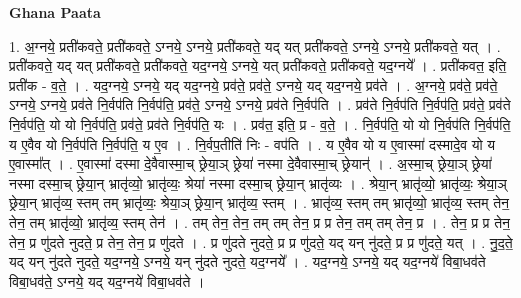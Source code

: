 \documentclass[17pt]{extarticle}
\begin{document}
\textbf{Ghana Paata } \newline

1. अ॒ग्नये॒ प्रती॑कवते॒ प्रती॑कवते॒ ऽग्नये॒ ऽग्नये॒ प्रती॑कवते॒ यद् यत् प्रती॑कवते॒ ऽग्नये॒ ऽग्नये॒ प्रती॑कवते॒ यत् । . प्रती॑कवते॒ यद् यत् प्रती॑कवते॒ प्रती॑कवते॒ यद॒ग्नये॒ ऽग्नये॒ यत् प्रती॑कवते॒ प्रती॑कवते॒ यद॒ग्नये᳚ । . प्रती॑कवत॒ इति॒ प्रती॑क - व॒ते॒ । . यद॒ग्नये॒ ऽग्नये॒ यद् यद॒ग्नये॒ प्रव॑ते॒ प्रव॑ते॒ ऽग्नये॒ यद् यद॒ग्नये॒ प्रव॑ते । . अ॒ग्नये॒ प्रव॑ते॒ प्रव॑ते॒ ऽग्नये॒ ऽग्नये॒ प्रव॑ते नि॒र्वप॑ति नि॒र्वप॑ति॒ प्रव॑ते॒ ऽग्नये॒ ऽग्नये॒ प्रव॑ते नि॒र्वप॑ति । . प्रव॑ते नि॒र्वप॑ति नि॒र्वप॑ति॒ प्रव॑ते॒ प्रव॑ते नि॒र्वप॑ति॒ यो यो नि॒र्वप॑ति॒ प्रव॑ते॒ प्रव॑ते नि॒र्वप॑ति॒ यः । . प्रव॑त॒ इति॒ प्र - व॒ते॒ । . नि॒र्वप॑ति॒ यो यो नि॒र्वप॑ति नि॒र्वप॑ति॒ य ए॒वैव यो नि॒र्वप॑ति नि॒र्वप॑ति॒ य ए॒व । . नि॒र्वप॒तीति॑ निः - वप॑ति । . य ए॒वैव यो य ए॒वास्मा॑ दस्मादे॒व यो य ए॒वास्मा᳚त् । . ए॒वास्मा॑ दस्मा दे॒वैवास्मा॒च् छ्रेया॒ञ् छ्रेया॑ नस्मा दे॒वैवास्मा॒च् छ्रेयान्॑ । . अ॒स्मा॒च् छ्रेया॒ञ् छ्रेया॑ नस्मा दस्मा॒च् छ्रेया॒न् भ्रातृ॑व्यो॒ भ्रातृ॑व्यः॒ श्रेया॑ नस्मा दस्मा॒च् छ्रेया॒न् भ्रातृ॑व्यः । . श्रेया॒न् भ्रातृ॑व्यो॒ भ्रातृ॑व्यः॒ श्रेया॒ञ् छ्रेया॒न् भ्रातृ॑व्य॒ स्तम् तम् भ्रातृ॑व्यः॒ श्रेया॒ञ् छ्रेया॒न् भ्रातृ॑व्य॒ स्तम् । . भ्रातृ॑व्य॒ स्तम् तम् भ्रातृ॑व्यो॒ भ्रातृ॑व्य॒ स्तम् तेन॒ तेन॒ तम् भ्रातृ॑व्यो॒ भ्रातृ॑व्य॒ स्तम् तेन॑ । . तम् तेन॒ तेन॒ तम् तम् तेन॒ प्र प्र तेन॒ तम् तम् तेन॒ प्र । . तेन॒ प्र प्र तेन॒ तेन॒ प्र णु॑दते नुदते॒ प्र तेन॒ तेन॒ प्र णु॑दते । . प्र णु॑दते नुदते॒ प्र प्र णु॑दते॒ यद् यन् नु॑दते॒ प्र प्र णु॑दते॒ यत् । . नु॒द॒ते॒ यद् यन् नु॑दते नुदते॒ यद॒ग्नये॒ ऽग्नये॒ यन् नु॑दते नुदते॒ यद॒ग्नये᳚ । . यद॒ग्नये॒ ऽग्नये॒ यद् यद॒ग्नये॑ विबा॒धव॑ते विबा॒धव॑ते॒ ऽग्नये॒ यद् यद॒ग्नये॑ विबा॒धव॑ते । \newline
\end{document}
